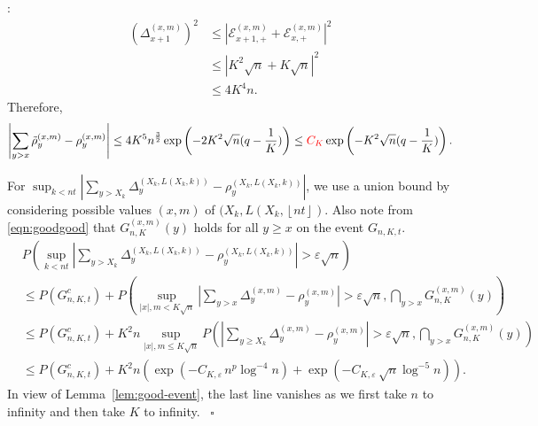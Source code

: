 \documentclass[twoside,12pt,a4paper]{article}
\numberwithin{equation}{section}
\newenvironment{proof}[1][Proof]{{\sc #1}:}{~\hfill $\square$}
\newcommand{\edt}[1]{\textcolor{red}{#1}} %
\begin{document}
\begin{proof}[Proof of Proposition~\ref{lm: approx local drift by conditional means}]
\begin{align*}
	\left( \Delta_{x+1}^{(x,m)} \right) ^2 
	&\leq \left| \mathcal{E}_{x+1,+}^{(x,m)} + \mathcal{E}_{x,+}^{(x,m)}  \right|^2  \\
	&\leq \left| K^2 \sqrt{n}  + K \sqrt{n}  \right|^2  \\
	&\leq 4 K^4 n.
\end{align*}
Therefore,
\[
\left| \sum_{y > x} \tilde\rho_y^{(x,m)} - \rho_y^{(x,m)} \right| \le 4 K^5 n^{\frac{3}{2}} \exp\left( - 2K^2 \sqrt{n}(q - \frac{1}{K}) \right) \leq \edt{ C_K}\exp\left( - K^2 \sqrt{n}(q - \frac{1}{K}) \right). 
\]



For $\sup_{k < nt} \left| \sum_{y > X_k} \Delta_y^{\left(X_k,L(X_k, k)\right)} - \rho_y^{\left(X_k,L(X_k, k)\right)} \right|$, we use a union bound by considering possible values $(x,m)$ of $(X_k, L(X_k, \left\lfloor nt  \right\rfloor)$. Also note from \eqref{eqn:goodgood} that $G_{n, K}^{(x,m)}(y)$ holds for all $y \ge x$ on the event $G_{n, K, t}$.
\begin{align*}
	& P\left( \sup_{k < nt} \left| \sum_{y > X_k} 
	\Delta_y^{\left(X_k,L(X_k, k)\right)} - \rho_y^{\left(X_k,L(X_k, k)\right)}
	\right| > \varepsilon \sqrt{n}  \right) \\
	&\le P(G_{n, K, t}^c) + P\left( \sup _{|x|, m < K \sqrt{n} } \left| \sum_{y > x} \Delta_y^{(x,m)} - \rho_y^{(x,m)} \right|  > \varepsilon \sqrt{n} , \bigcap_{y > x} G_{n, K}^{(x,m)}(y) \right) \\
	&\le P(G_{n, K, t}^c) + K^2 n \sup _{|x|, m \le  K \sqrt{n} }
	P\left( \left| \sum_{y \ge X_k} \Delta_y^{(x,m)} - \rho_y^{(x,m)} \right|  > \varepsilon \sqrt{n} , \bigcap_{y > x} G_{n, K}^{(x,m)}(y) \right) \\
	&\le P(G_{n, K, t}^c) + K^2 n \left( \exp\left( - C_{K, \varepsilon} \, n^{p } \log^{-4} n \right) + \exp\left( - C_{K, \varepsilon} \, \sqrt{n}  \log^{-5} n \right) \right) 
.\end{align*}
In view of Lemma~\ref{lem:good-event}, the last line vanishes as we first take $n$ to infinity and then take $K$ to infinity.
\end{proof}


\printbibliography
\end{document}
